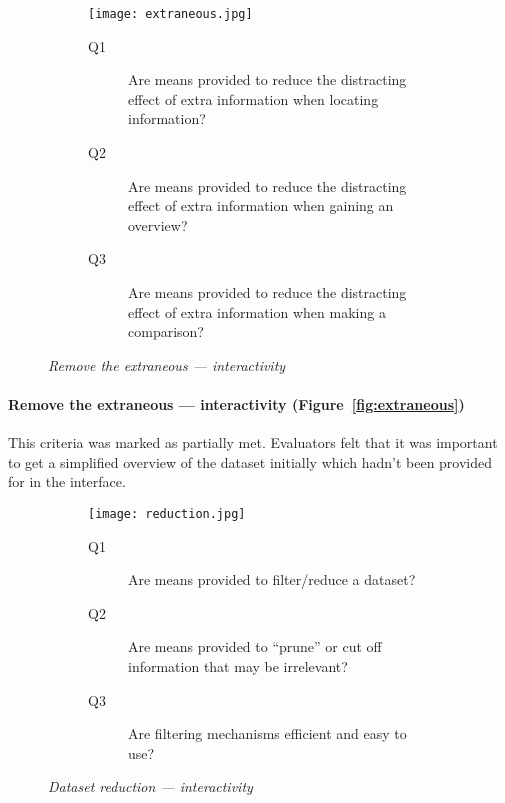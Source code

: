 \begin{figure}[!htb]
\centering
\begin{subfigure}{.5\textwidth}
	\centering
	\texttt{[image: extraneous.jpg]}
\end{subfigure}%
\begin{subfigure}{.5\textwidth}
  \begin{description}
	\item[Q1]Are means provided to reduce the distracting effect of extra information when locating information?
	\item[Q2]Are means provided to reduce the distracting effect of extra information when gaining an overview?
	\item[Q3]Are means provided to reduce the distracting effect of extra information when making a comparison?
  \end{description}
\end{subfigure}
\caption{\textit{Remove the extraneous --- interactivity }}
\label{fig:extraneous}
\end{figure}

\paragraph{Remove the extraneous --- interactivity (Figure~\vref{fig:extraneous})}

This criteria was marked as partially met. Evaluators felt that it was important to get a simplified overview of the dataset initially which hadn't been provided for in the interface.

\begin{figure}[!htb]
\centering
\begin{subfigure}{.5\textwidth}
	\centering
	\texttt{[image: reduction.jpg]}
\end{subfigure}%
\begin{subfigure}{.5\textwidth}
  \begin{description}
	\item[Q1]Are means provided to filter/reduce a dataset?
	\item[Q2]Are means provided to ``prune'' or cut off information that may be irrelevant?
	\item[Q3]Are filtering mechanisms efficient and easy to use?
  \end{description}
\end{subfigure}
\caption{\textit{Dataset reduction --- interactivity }}
\label{fig:reduction}
\end{figure}

